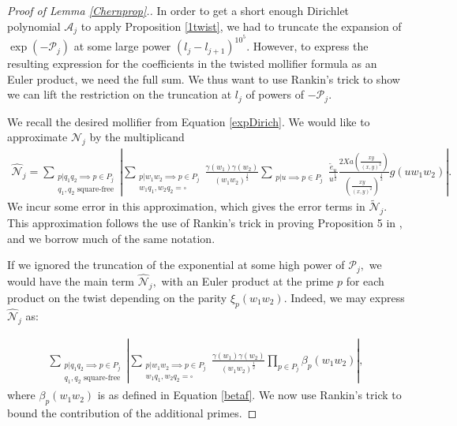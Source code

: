 \documentclass[12pt]{amsart}
\numberwithin{equation}{section}
\numberwithin{thm}{section}
\newcommand{\1}{\mathbf 1}
\begin{document}
\begin{proof}[Proof of Lemma \ref{Chernprop}.]
		
		In order to get a short enough Dirichlet polynomial $\mathscr{A}_j$ to apply Proposition \ref{1twist}, we had to truncate the expansion of $\exp\left(-\mathscr{P}_j\right)$ at some large power $(l_j-l_{j+1})^{10^5}.$ However, to express the resulting expression for the coefficients in the twisted mollifier formula as an Euler product, we need the full sum.  
		We thus want to use Rankin's trick to show we can lift the restriction on the truncation at $l_j$ of powers of $-\mathscr{P}_j.$
		
		We recall the desired mollifier from Equation \eqref{expDirich}. We would like to approximate $\mathscr{N}_{j}$ by the multiplicand  
		\begin{align}\label{hatN}\hat{\mathscr{N}}_j=\sum_{\substack{p|q_1q_2\implies p\in P_{j}\\ q_1,q_2\text{ square-free}}}\left|\sum_{\substack{p|w_1w_2\implies p\in P_{j}\\ w_1q_1,w_2q_2=\square}}\frac{\gamma(w_1)\gamma(w_2)}{(w_1w_2)^{\frac{1}{2}}}
			\sum_{\substack{p|u\implies p\in P_j}}			
			\frac{\tilde{e}_{u}}{u^{\frac{1}{2}}} \frac{2Xa\left(\frac{xy}{(x,y)^2}\right)}{ \left(\frac{xy}{(x,y)^2}\right)^{\frac{1}{2}}}g(uw_1w_2)\right|.\end{align}
		We incur some error in this approximation, which gives the error terms in $\tilde{\mathscr{N}}_{j}.$		
		This approximation follows the use of Rankin's trick in proving Proposition 5 in \cite{RS2}, and we borrow much of the same notation.
		
		If we ignored the truncation of the exponential at some high power of $\mathscr{P}_j,$ we would have the main term $\hat{\mathscr{N}}_{j},$ with an Euler product at the prime $p$ for each product on the twist depending on the parity $\xi_{p}(w_1w_2)$.
		Indeed, we may express $\hat{\mathscr{N}}_{j}$ as:  
		
		\begin{equation}\label{newN}\begin{split}
				\sum_{\substack{p|q_1q_2\implies p\in P_{j}\\ q_1,q_2\text{ square-free}}}\left|\sum_{\substack{p|w_1w_2\implies p\in P_{j}\\ w_1q_1,w_2q_2=\square}}\frac{\gamma(w_1)\gamma(w_2)}{(w_1w_2)^{\frac{1}{2}}}\prod_{p\in P_j}\beta_p(w_1w_2) \right|,	\end{split}
		\end{equation}
		where $\beta_p(w_1w_2)$ is as defined in Equation \eqref{betaf}.
	We now use Rankin's trick to bound the contribution of the additional primes. 
	

\end{proof}
\end{document}

